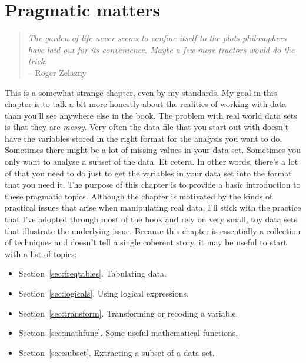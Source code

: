 



\chapter{Pragmatic matters~\label{ch:datahandling}}

\begin{quote}
{\it The garden of life never seems to confine itself to the plots philosophers have
laid out for its convenience. Maybe a few more tractors would do the trick.} \\ \hspace*{2cm} -- Roger Zelazny
\end{quote}


This is a somewhat strange chapter, even by my standards. My goal in this chapter is to talk a bit more honestly about the realities of working with data than you'll see anywhere else in the book. The problem with real world data sets is that they are {\it messy}. Very often the data file that you start out with doesn't have the variables stored in the right format for the analysis you want to do. Sometimes there might be a lot of missing values in your data set. Sometimes you only want to analyse a subset of the data. Et cetera. In other words, there's a lot of  that you need to do just to get the variables in your data set into the format that you need it. The purpose of this chapter is to provide a basic introduction to these pragmatic topics. Although the chapter is motivated by the kinds of practical issues that arise when manipulating real data, I'll stick with the practice that I've adopted through most of the book and rely on very small, toy data sets that illustrate the underlying issue. Because this chapter is essentially a collection of techniques and doesn't tell a single coherent story, it may be useful to start with a list of topics:

\begin{itemize} 
\item Section~\ref{sec:freqtables}. Tabulating data.
\item Section~\ref{sec:logicals}. Using logical expressions.
\item Section~\ref{sec:transform}. Transforming or recoding a variable.
\item Section~\ref{sec:mathfunc}. Some useful mathematical functions.
\item Section~\ref{sec:subset}. Extracting a subset of a data set.
\end{itemize}


